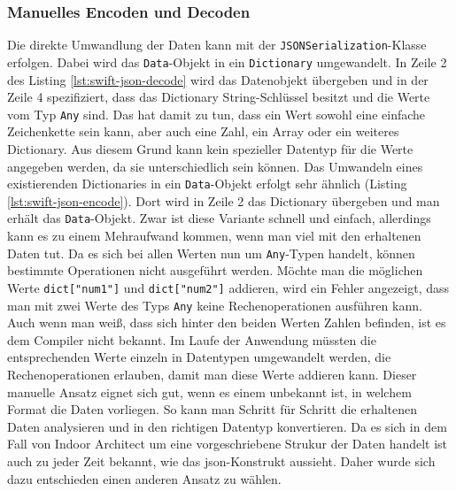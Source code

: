 \subsubsection{Manuelles Encoden und Decoden}
Die direkte Umwandlung der Daten kann mit der \texttt{JSONSerialization}-Klasse erfolgen.
Dabei wird das \texttt{Data}-Objekt in ein \texttt{Dictionary} umgewandelt.
In Zeile 2 des Listing \ref{lst:swift-json-decode} wird das Datenobjekt übergeben und in der Zeile 4 spezifiziert, dass das Dictionary String-Schlüssel besitzt und die Werte vom Typ \texttt{Any} sind.
Das hat damit zu tun, dass ein Wert sowohl eine einfache Zeichenkette sein kann, aber auch eine Zahl, ein Array oder ein weiteres Dictionary.
Aus diesem Grund kann kein spezieller Datentyp für die Werte angegeben werden, da sie unterschiedlich sein können.
Das Umwandeln eines existierenden Dictionaries in ein \texttt{Data}-Objekt erfolgt sehr ähnlich (Listing \ref{lst:swift-json-encode}).
Dort wird in Zeile 2 das Dictionary übergeben und man erhält das \texttt{Data}-Objekt.\pbreak%
%
Zwar ist diese Variante schnell und einfach, allerdings kann es zu einem Mehraufwand kommen, wenn man viel mit den erhaltenen Daten tut.
Da es sich bei allen Werten nun um \texttt{Any}-Typen handelt, können bestimmte Operationen nicht ausgeführt werden.
Möchte man die möglichen Werte \texttt{dict["num1"]} und \texttt{dict["num2"]} addieren, wird ein Fehler angezeigt, dass man mit zwei Werte des Typs \texttt{Any} keine Rechenoperationen ausführen kann.
Auch wenn man weiß, dass sich hinter den beiden Werten Zahlen befinden, ist es dem Compiler nicht bekannt.
Im Laufe der Anwendung müssten die entsprechenden Werte einzeln in Datentypen umgewandelt werden, die Rechenoperationen erlauben, damit man diese Werte addieren kann.\pbreak%
%
Dieser manuelle Ansatz eignet sich gut, wenn es einem unbekannt ist, in welchem Format die Daten vorliegen.
So kann man Schritt für Schritt die erhaltenen Daten analysieren und in den richtigen Datentyp konvertieren.
Da es sich in dem Fall von Indoor Architect um eine vorgeschriebene Strukur der Daten handelt ist auch zu jeder Zeit bekannt, wie das \ac{json}-Konstrukt aussieht.
Daher wurde sich dazu entschieden einen anderen Ansatz zu wählen.

